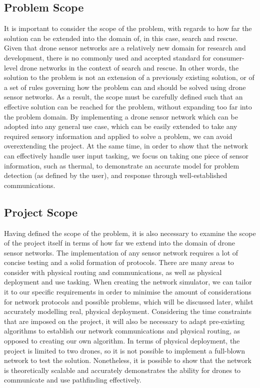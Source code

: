		\subsection{Problem Scope}
		It is important to consider the scope of the problem, with regards to how far the solution can be extended into the domain of, in this case, search and rescue. Given that drone sensor networks are a relatively new domain for research and development, there is no commonly used and accepted standard for consumer-level drone networks in the context of search and rescue. In other words, the solution to the problem is not an extension of a previously existing solution, or of a set of rules governing how the problem can and should be solved using drone sensor networks.
As a result, the scope must be carefully defined such that an effective solution can be reached for the problem, without expanding too far into the problem domain. By implementing a drone sensor network which can be adopted into any general use case, which can be easily extended to take any required sensory information and applied to solve a problem, we can avoid overextending the project. At the same time, in order to show that the network can effectively handle user input tasking, we focus on taking one piece of sensor information, such as thermal, to demonstrate an accurate model for problem detection (as defined by the user), and response through well-established communications. 
		\subsection{Project Scope}
		Having defined the scope of the problem, it is also necessary to examine the scope of the project itself in terms of how far we extend into the domain of drone sensor networks. The implementation of any sensor network requires a lot of concise testing and a solid formation of protocols. There are many areas to consider with physical routing and communications, as well as physical deployment and use tasking. When creating the network simulator, we can tailor it to our specific requirements in order to minimise the amount of considerations for network protocols and possible problems, which will be discussed later, whilst accurately modelling real, physical deployment. 
Considering the time constraints that are imposed on the project, it will also be necessary to adapt pre-existing algorithms to establish our network communications and physical routing, as opposed to creating our own algorithm. In terms of physical deployment, the project is limited to two drones, so it is not possible to implement a full-blown network to test the solution. Nonetheless, it is possible to show that the network is theoretically scalable and accurately demonstrates the ability for drones to communicate and use pathfinding effectively.
